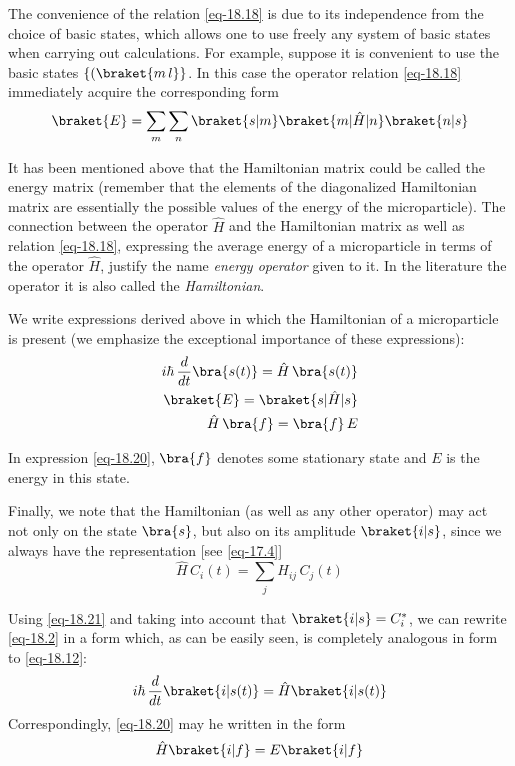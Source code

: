 \documentclass[a4paper,sfsidenotes,colorlinks=true]{tufte-book}
\numberwithin{equation}{section}
\numberwithin{figure}{section}
\begin{document}
The convenience of the relation \ref{eq-18.18} is due to its
independence from the choice of basic states, which allows one to use
freely any system of basic states when carrying out calculations. For
example, suppose it is convenient to use the basic states
$\left\{(\braket{m \, l}\right\}$. In this case the operator relation
\ref{eq-18.18} immediately acquire the corresponding form 
\begin{equation}%
\braket{E} = \sum_{m} \sum_{n} \braket{s|m} \braket{m|\hat{H}|n} \braket{n|s}
\label{eq-18.19}
\end{equation}

It has been mentioned above
that the Hamiltonian matrix could be called the energy matrix
(remember that the elements of the diagonalized Hamiltonian matrix are
essentially the possible values of the energy of the
microparticle). The connection between the operator $\hat{H}$ and the
Hamiltonian matrix as well as relation \ref{eq-18.18}, expressing the average
energy of a microparticle in terms of the operator $\hat{H}$, justify the name
\emph{energy operator} given to it. In the literature the operator it is also
called the \emph{Hamiltonian}.

We write expressions derived above in which the Hamiltonian of a
microparticle is present (we emphasize the exceptional importance of
these expressions): 
\begin{align}
i \hbar \, \frac{d}{dt} \bra{s(t)} = \hat{H} \, \bra{s(t)}
\label{eq-18.12} \\
\braket{E} = \braket{s|\hat{H}|s} 
\label{eq-18.18} \\
\hat{H} \, \bra{f} = \bra{f} \, E
\label{eq-18.20}
\end{align}

In expression \ref{eq-18.20}, $\bra{f}$ denotes some stationary state
and $E$ is the energy in this state.

Finally, we note that the Hamiltonian (as well as any other operator) may act not only on the state $\bra{s}$, but also on its amplitude $\braket{i|s}$, since we always have the representation [see \ref{eq-17.4}]
\begin{equation}%
\hat{H} \,C_{i} (t) = \sum_{j} H_{ij} \,C_{j} (t)
\label{eq-18.21}
\end{equation}

Using \ref{eq-18.21} and taking into account that $\braket{i| s}  =
C_{i}^{*}$, we can rewrite \ref{eq-18.2} in a form which, as can be
easily seen, is completely analogous in form to \ref{eq-18.12}:
\begin{equation}%
i \hbar \, \frac{d}{dt} \braket{i|s(t)} = \hat{H} \braket{i|s(t)}
\label{eq-18.22} 
\end{equation}
Correspondingly, \ref{eq-18.20} may he written in the form
\begin{equation}%
\hat{H} \braket{i|f} = E \braket{i|f}
\label{eq-18.23}
\end{equation}
\end{document}
